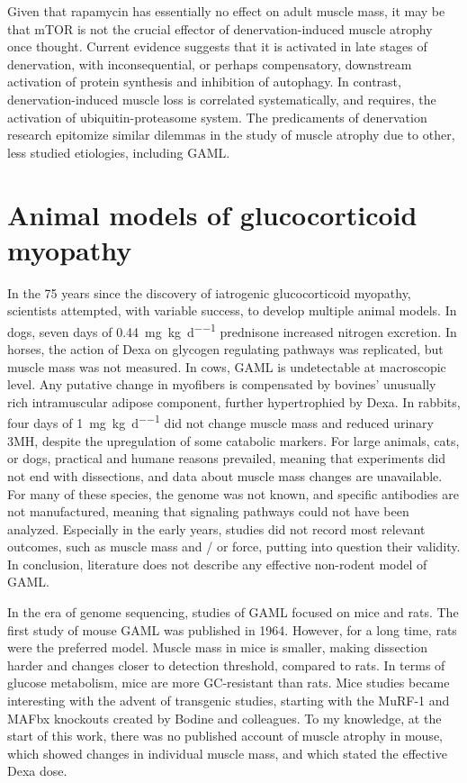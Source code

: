 \documentclass[12pt,english]{report}\usepackage[]{graphicx}\usepackage[]{color}
\begin{document}
Given that rapamycin has essentially no effect on adult muscle mass,
it may be that mTOR is not the crucial effector of denervation-induced
muscle atrophy once thought. Current evidence suggests that it is
activated in late stages of denervation, with inconsequential, or
perhaps compensatory, downstream activation of protein synthesis and
inhibition of autophagy. In contrast, denervation-induced muscle loss
is correlated systematically, and requires, the activation of ubiquitin-proteasome
system. The predicaments of denervation research epitomize similar
dilemmas in the study of muscle atrophy due to other, less studied
etiologies, including GAML.


\section{Animal models of glucocorticoid myopathy}

In the 75 years since the discovery of iatrogenic glucocorticoid myopathy,
scientists attempted, with variable success, to develop multiple animal
models. In dogs, seven days of \SI{0.44}{\milli\gram\per\kilo\gram\per\day}
prednisone increased nitrogen excretion\citep{muhlbacher1984effects}.
In horses, the action of Dexa on glycogen regulating pathways was
replicated, but muscle mass was not measured\citep{tiley2008effects}.
In cows, GAML is undetectable at macroscopic level. Any putative change
in myofibers is compensated by bovines' unusually rich intramuscular
adipose component, further hypertrophied by Dexa\citep{corah1995effects}.
In rabbits, four days of \SI{1}{\milli\gram\per\kilo\gram\per\day}
did not change muscle mass and reduced urinary 3MH, despite the upregulation
of some catabolic markers\citep{yeh1994effects}. For large animals,
cats, or dogs, practical and humane reasons prevailed, meaning that
experiments did not end with dissections, and data about muscle mass
changes are unavailable. For many of these species, the genome was
not known, and specific antibodies are not manufactured, meaning that
signaling pathways could not have been analyzed. Especially in the
early years, studies did not record most relevant outcomes, such as
muscle mass and / or force, putting into question their validity.
In conclusion, literature does not describe any effective non-rodent
model of GAML.

In the era of genome sequencing, studies of GAML focused on mice and
rats. The first study of mouse GAML was published in 1964\citep{rohdewald1964uber}.
However, for a long time, rats were the preferred model. Muscle mass
in mice is smaller, making dissection harder and changes closer to
detection threshold, compared to rats. In terms of glucose metabolism,
mice are more GC-resistant than rats\citep{protzek2014augmented}.
Mice studies became interesting with the advent of transgenic studies,
starting with the MuRF-1 and MAFbx knockouts created by Bodine and
colleagues\citep{bodine2001identification}. To my knowledge, at the
start of this work, there was no published account of muscle atrophy
in mouse, which showed changes in individual muscle mass, and which
stated the effective Dexa dose. 
\end{document}
